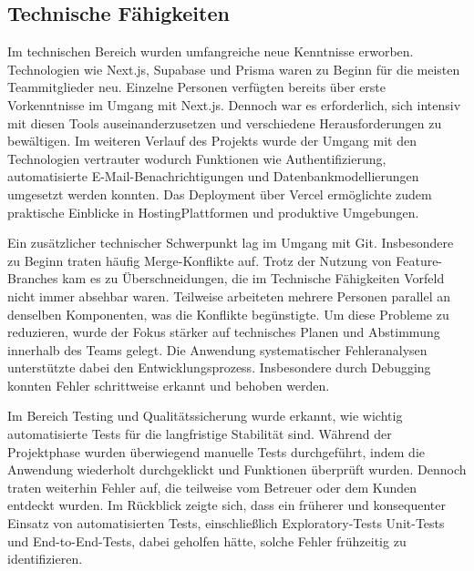 \documentclass[a4paper,12pt]{article}
\begin{document}

\subsection{Technische Fähigkeiten}

Im technischen Bereich wurden umfangreiche neue Kenntnisse erworben. Technologien wie Next.js, Supabase und Prisma waren zu Beginn für die meisten Teammitglieder neu. Einzelne Personen verfügten bereits über erste Vorkenntnisse im Umgang mit Next.js. Dennoch war es erforderlich, sich intensiv mit diesen Tools auseinanderzusetzen und verschiedene Herausforderungen zu bewältigen. Im weiteren Verlauf des Projekts wurde der Umgang mit den Technologien vertrauter wodurch Funktionen wie Authentifizierung, automatisierte E-Mail-Benachrichtigungen und Datenbankmodellierungen umgesetzt werden konnten. Das Deployment über Vercel ermöglichte zudem praktische Einblicke in HostingPlattformen und produktive Umgebungen.

Ein zusätzlicher technischer Schwerpunkt lag im Umgang mit Git. Insbesondere zu Beginn traten häufig \gls{Merge-Konflikte} auf. Trotz der Nutzung von \gls{Feature-Branches} kam es zu Überschneidungen, die im Technische Fähigkeiten Vorfeld nicht immer absehbar waren. Teilweise arbeiteten mehrere Personen parallel an denselben Komponenten, was die Konflikte begünstigte. Um diese Probleme zu reduzieren, wurde der Fokus stärker auf technisches Planen und Abstimmung innerhalb des Teams gelegt. Die Anwendung systematischer Fehleranalysen unterstützte dabei den Entwicklungsprozess. Insbesondere durch \gls{Debugging} konnten Fehler schrittweise erkannt und behoben werden.

Im Bereich Testing und Qualitätssicherung wurde erkannt, wie wichtig automatisierte Tests für die langfristige Stabilität sind. Während der Projektphase wurden überwiegend manuelle Tests durchgeführt, indem die Anwendung wiederholt durchgeklickt und Funktionen überprüft wurden. Dennoch traten weiterhin Fehler auf, die teilweise vom Betreuer oder dem Kunden entdeckt wurden. Im Rückblick zeigte sich, dass ein früherer und konsequenter Einsatz von automatisierten Tests, einschließlich \gls{Exploratory-Tests} Unit-Tests und \gls{End-to-End-Tests}, dabei geholfen hätte, solche Fehler frühzeitig zu identifizieren.

\end{document}
